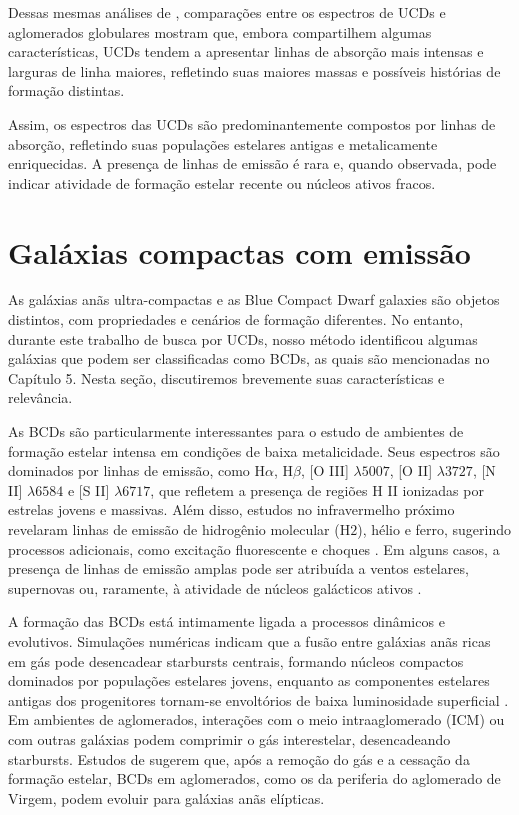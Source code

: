 Dessas mesmas análises de \cite{Mieske_2006}, comparações entre os espectros de UCDs e aglomerados globulares mostram que, embora compartilhem algumas características, UCDs tendem a apresentar linhas de absorção mais intensas e larguras de linha maiores, refletindo suas maiores massas e possíveis histórias de formação distintas.

Assim, os espectros das UCDs são predominantemente compostos por linhas de absorção, refletindo suas populações estelares antigas e metalicamente enriquecidas. A presença de linhas de emissão é rara e, quando observada, pode indicar atividade de formação estelar recente ou núcleos ativos fracos.

\section{Galáxias compactas com emissão}\label{sec:galaxias_compactas_emissao}
As galáxias anãs ultra-compactas e as Blue Compact Dwarf galaxies são objetos distintos, com propriedades e cenários de formação diferentes. No entanto, durante este trabalho de busca por UCDs, nosso método identificou algumas galáxias que podem ser classificadas como BCDs, as quais são mencionadas no Capítulo 5. Nesta seção, discutiremos brevemente suas características e relevância.

As BCDs são particularmente interessantes para o estudo de ambientes de formação estelar intensa em condições de baixa metalicidade. Seus espectros são dominados por linhas de emissão, como H$\alpha$, H$\beta$, [O III] $\lambda 5007$, [O II] $\lambda 3727$, [N II] $\lambda 6584$ e [S II] $\lambda 6717$, que refletem a presença de regiões H II ionizadas por estrelas jovens e massivas. Além disso, estudos no infravermelho próximo revelaram linhas de emissão de hidrogênio molecular (H$2$), hélio e ferro, sugerindo processos adicionais, como excitação fluorescente e choques \citep{Izotov_2011}. Em alguns casos, a presença de linhas de emissão amplas pode ser atribuída a ventos estelares, supernovas ou, raramente, à atividade de núcleos galácticos ativos \citep{Izotov_2007}.

A formação das BCDs está intimamente ligada a processos dinâmicos e evolutivos. Simulações numéricas indicam que a fusão entre galáxias anãs ricas em gás pode desencadear starbursts centrais, formando núcleos compactos dominados por populações estelares jovens, enquanto as componentes estelares antigas dos progenitores tornam-se envoltórios de baixa luminosidade superficial \citep{Bekki_2008}. Em ambientes de aglomerados, interações com o meio intraaglomerado (ICM) ou com outras galáxias podem comprimir o gás interestelar, desencadeando starbursts. Estudos de \citep{Watts_2016} sugerem que, após a remoção do gás e a cessação da formação estelar, BCDs em aglomerados, como os da periferia do aglomerado de Virgem, podem evoluir para galáxias anãs elípticas.

